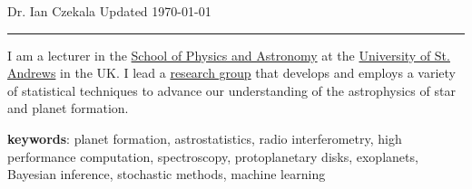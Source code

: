 \documentclass[10pt]{article}
\begin{document}
 \selectfont

{\huge \textcolor{myblue1}{Dr. Ian Czekala} } {\small \hfill Updated \today}

\rule{\textwidth}{1pt}



\vspace{12pt}

I am a lecturer in the \href{https://www.st-andrews.ac.uk/physics-astronomy/}{School of Physics and Astronomy} at the \href{https://www.st-andrews.ac.uk/}{University of St. Andrews} in the UK. I lead a \href{https://iancze.github.io/}{research group} that develops and employs a variety of statistical techniques to advance our understanding of the astrophysics of star and planet formation.

\textbf{keywords}: planet formation, astrostatistics, radio interferometry, high performance computation, spectroscopy, protoplanetary disks, exoplanets, Bayesian inference, stochastic methods, machine learning






















\end{document}
